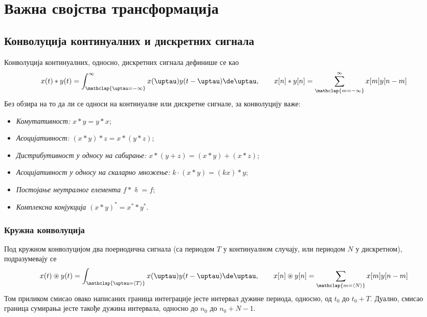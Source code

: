 \renewcommand{\thechapter}{S}
\setcounter{section}{0}
\chapter{Важна својства трансформација}


\section{Конволуција континуалних и дискретних сигнала}
Конволуција континуалних, односно, дискретних сигнала дефинише се као 
\begin{equation}
    x(t) \ast y(t) = \int_{\mathclap{\uptau = -\infty}}^{\infty} x(\uptau) y(t-\uptau) \de \uptau, 
    \qquad
    x[n] \ast y[n] = \sum_{\mathclap{m = -\infty}}^{\infty} x[m] y[n-m] 
\end{equation}
Без обзира на то да ли се односи на континуалне или дискретне сигнале, за конволуцију важе:
\begin{itemize}\itemsep0pt
    \item \emph{Комутативност:} $x \ast y = y \ast x$;
    \item \emph{Асоцијативност:} $(x \ast y) \ast z = x \ast (y \ast z)$;
    \item \emph{Дистрибутивност у односу на сабирање:} $x \ast (y + z) = (x \ast y) + (x \ast z)$;
    \item \emph{Асоцијативност у односу на скаларно множење:} $k \cdot (x \ast y) = (kx) \ast y$; 
    \item \emph{Постојање неутралног елемента} $f \ast \updelta = f$; 
    \item \emph{Комплексна конјукција} $(x \ast y)^\ast = x^{\ast} \ast y^{\ast}$.
\end{itemize}

\subsection{Кружна конволуција}
Под кружном конволуцијом два поериодична сигнала (са периодом $T$ у континуалном случају, или 
периодом $N$ у дискретном), подразумевају се 
\begin{equation}
    x(t) \circledast y(t) = \int_{\mathclap{\uptau = \langle T \rangle }} x(\uptau) y(t-\uptau) \de \uptau, 
    \qquad
    x[n] \circledast y[n] = \sum_{\mathclap{m = \langle N \rangle }} x[m] y[n-m] 
\end{equation}
Том приликом смисао овако написаних граница интеграције јесте интервал дужине периода, односно, од $t_0$ до $t_0 + T$. 
Дуално, смисао граница сумирања јесте такође дужина интервала, односно до $n_0$ до $n_0 + N - 1$. 

